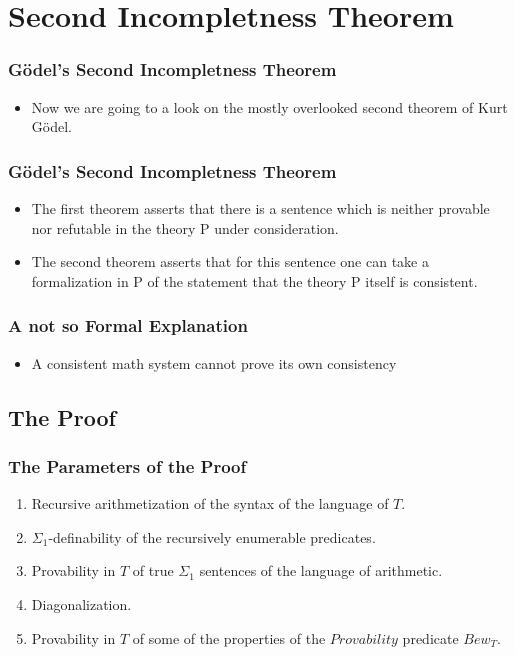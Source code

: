 \documentclass[aspectratio=169]{beamer}
\begin{document}
\section{Second Incompletness Theorem}
\begin{frame}
	\frametitle{Gödel's Second Incompletness Theorem}
	\begin{itemize}
		\item Now we are going to a look on the mostly overlooked second theorem of Kurt Gödel.
	\end{itemize}
\end{frame}

\begin{frame}
	\frametitle{Gödel's Second Incompletness Theorem}
	\begin{itemize}
		\item The first theorem asserts that there is a sentence which is neither provable nor refutable in the theory P under consideration.
		\item The second theorem asserts that for this sentence one can take a formalization in P of the statement that the theory P itself is consistent.
	\end{itemize}
\end{frame}

\begin{frame}
	\frametitle{A not so Formal Explanation}
	\begin{itemize}
		\item A consistent math system cannot prove its own consistency
	\end{itemize}
\end{frame}

\subsection{The Proof}
\begin{frame}
	\frametitle{The Parameters of the Proof}
	\begin{enumerate}
		\item Recursive arithmetization of the syntax of the language of $T$.
		\item $\Sigma_1$-definability of the recursively enumerable predicates.
		\item Provability in $T$ of true $\Sigma_1$ sentences of the language of arithmetic.
		\item Diagonalization.
		\item Provability in $T$ of some of the properties of the $Provability$ predicate $Bew_T$.
	\end{enumerate}
	\begin{flushright}
		\cite{bag}
	\end{flushright}
\end{frame}
\end{document}
